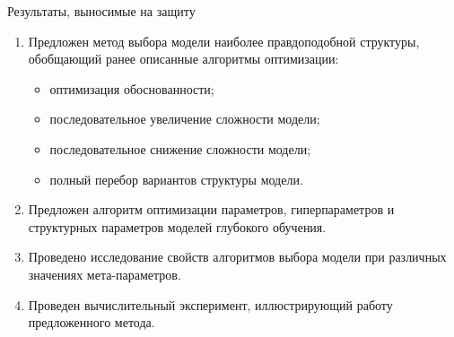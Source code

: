 \documentclass[usenames,dvipsnames,11pt,pdf,utf8,russian,aspectratio=43]{beamer}
\begin{document}
\begin{frame}{Результаты, выносимые на защиту}
\begin{enumerate}
\item Предложен метод выбора модели наиболее правдоподобной структуры, обобщающий ранее описанные алгоритмы оптимизации:
\begin{itemize}
\item оптимизация обоснованности;
\item последовательное увеличение сложности модели;
\item последовательное снижение сложности модели;
\item полный перебор вариантов структуры модели.
\end{itemize}

\item Предложен алгоритм оптимизации параметров, гиперпараметров и структурных
параметров моделей глубокого обучения.

\item Проведено исследование свойств алгоритмов выбора модели при различных значениях мета-параметров.

\item Проведен вычислительный эксперимент, иллюстрирующий работу предложенного метода.

\end{enumerate}
\end{frame}
\end{document}
